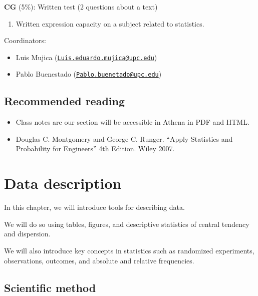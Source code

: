 \documentclass[
]{book}
\providecommand{\tightlist}{%
  \setlength{\itemsep}{0pt}\setlength{\parskip}{0pt}}
\begin{document}
\textbf{CG} (5\%): Written test (2 questions about a text)

\begin{enumerate}
\def\labelenumi{\alph{enumi}.}
\tightlist
\item
  Written expression capacity on a subject related to statistics.
\end{enumerate}

Coordinators:

\begin{itemize}
\tightlist
\item
  Luis Mujica (\href{mailto:Luis.eduardo.mujica@upc.edu}{\nolinkurl{Luis.eduardo.mujica@upc.edu}})
\item
  Pablo Buenestado (\href{mailto:Pablo.buenetado@upc.edu}{\nolinkurl{Pablo.buenetado@upc.edu}})
\end{itemize}

\hypertarget{recommended-reading}{%
\section{Recommended reading}\label{recommended-reading}}

\begin{itemize}
\item
  Class notes are our section will be accessible in Athena in PDF and HTML.
\item
  Douglas C. Montgomery and George C. Runger. ``Apply Statistics and Probability for Engineers'' 4th Edition. Wiley 2007.
\end{itemize}

\hypertarget{data-description}{%
\chapter{Data description}\label{data-description}}

In this chapter, we will introduce tools for describing data.

We will do so using tables, figures, and descriptive statistics of central tendency and dispersion.

We will also introduce key concepts in statistics such as randomized experiments, observations, outcomes, and absolute and relative frequencies.

\hypertarget{scientific-method}{%
\section{Scientific method}\label{scientific-method}}
\end{document}
